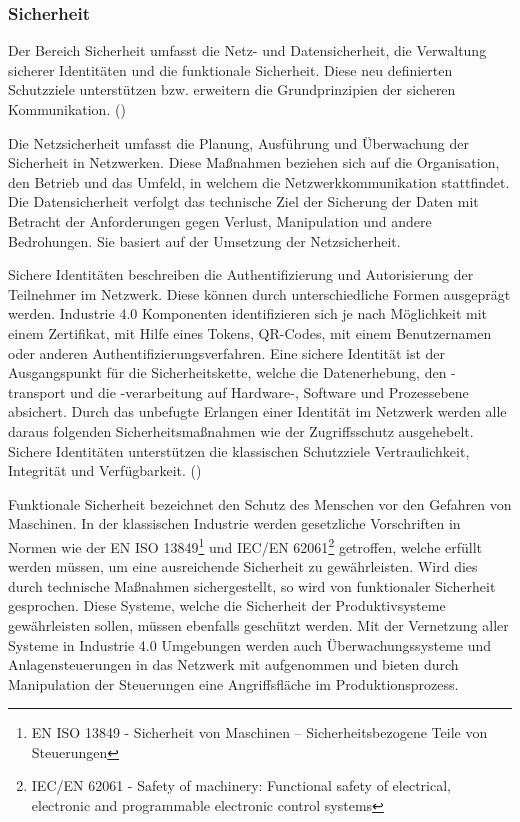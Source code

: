 \subsubsection{Sicherheit}
Der Bereich Sicherheit umfasst die Netz- und Datensicherheit, die Verwaltung sicherer Identitäten und die funktionale Sicherheit. Diese neu definierten Schutzziele unterstützen bzw. erweitern die Grundprinzipien der sicheren Kommunikation. (\cite{BMWiNeCon2016})

Die Netzsicherheit umfasst die Planung, Ausführung und Überwachung der Sicherheit in Netzwerken. Diese Maßnahmen beziehen sich auf die Organisation, den Betrieb und das Umfeld, in welchem die Netzwerkkommunikation stattfindet. Die Datensicherheit verfolgt das technische Ziel der Sicherung der Daten mit Betracht der Anforderungen gegen Verlust, Manipulation und andere Bedrohungen. Sie basiert auf der Umsetzung der Netzsicherheit.

Sichere Identitäten beschreiben die Authentifizierung und Autorisierung der Teilnehmer im Netzwerk. Diese können durch unterschiedliche Formen ausgeprägt werden. Industrie 4.0 Komponenten identifizieren sich je nach Möglichkeit mit einem Zertifikat, mit Hilfe eines Tokens, QR-Codes, mit einem Benutzernamen oder anderen Authentifizierungsverfahren. Eine sichere Identität ist der Ausgangspunkt für die Sicherheitskette, welche die Datenerhebung, den -transport und die -verarbeitung auf Hardware-, Software und Prozessebene absichert. Durch das unbefugte Erlangen einer Identität im Netzwerk werden alle daraus folgenden Sicherheitsmaßnahmen wie der Zugriffsschutz ausgehebelt. Sichere Identitäten unterstützen die klassischen Schutzziele Vertraulichkeit, Integrität und Verfügbarkeit. (\cite{sichIden2017})

Funktionale Sicherheit bezeichnet den Schutz des Menschen vor den Gefahren von Maschinen. In der klassischen Industrie werden gesetzliche Vorschriften in Normen wie der EN ISO 13849\footnote{EN ISO 13849 - Sicherheit von Maschinen – Sicherheitsbezogene Teile von Steuerungen} und \ac{IEC}/EN 62061\footnote{IEC/EN 62061 - Safety of machinery: Functional safety of electrical, electronic and programmable electronic control systems} getroffen, welche erfüllt werden müssen, um eine ausreichende Sicherheit zu gewährleisten. Wird dies durch technische Maßnahmen sichergestellt, so wird von funktionaler Sicherheit gesprochen. Diese Systeme, welche die Sicherheit der Produktivsysteme gewährleisten sollen, müssen ebenfalls geschützt werden. Mit der Vernetzung aller Systeme in Industrie 4.0 Umgebungen werden auch Überwachungssysteme und Anlagensteuerungen in das Netzwerk mit aufgenommen und bieten durch Manipulation der Steuerungen eine Angriffsfläche im Produktionsprozess.

